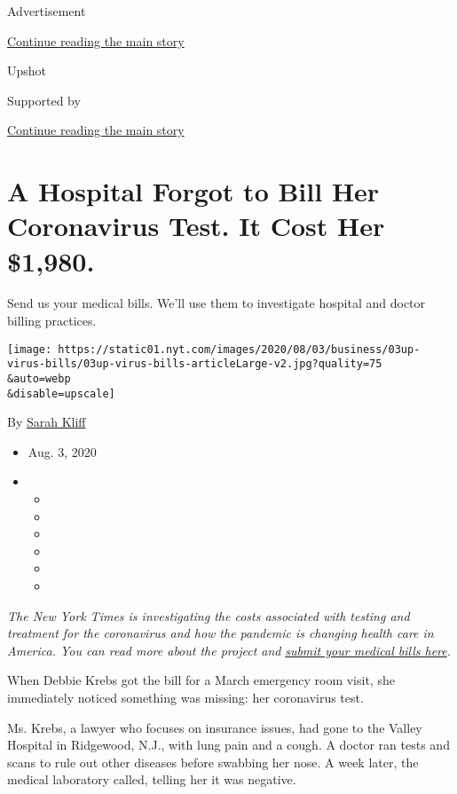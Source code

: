 Advertisement

\protect\hyperlink{after-top}{Continue reading the main story}

Upshot

Supported by

\protect\hyperlink{after-sponsor}{Continue reading the main story}

\hypertarget{a-hospital-forgot-to-bill-her-coronavirus-test-it-cost-her-1980}{%
\section{A Hospital Forgot to Bill Her Coronavirus Test. It Cost Her
\$1,980.}\label{a-hospital-forgot-to-bill-her-coronavirus-test-it-cost-her-1980}}

Send us your medical bills. We'll use them to investigate hospital and
doctor billing practices.

\texttt{[image: https://static01.nyt.com/images/2020/08/03/business/03up-virus-bills/03up-virus-bills-articleLarge-v2.jpg?quality=75\\\&auto=webp\\\&disable=upscale]}

By \href{https://www.nytimes.com/by/sarah-kliff}{Sarah Kliff}

\begin{itemize}
\item
  Aug. 3, 2020
\item
  \begin{itemize}
  \item
  \item
  \item
  \item
  \item
  \item
  \end{itemize}
\end{itemize}

\emph{The New York Times is investigating the costs associated with
testing and treatment for the coronavirus and how the pandemic is
changing health care in America. You can read more about the project
and}
\href{https://www.nytimes.com/2020/08/03/reader-center/coronavirus-medical-bills.html}{\emph{submit
your medical bills here}}\emph{.}

When Debbie Krebs got the bill for a March emergency room visit, she
immediately noticed something was missing: her coronavirus test.

Ms. Krebs, a lawyer who focuses on insurance issues, had gone to the
Valley Hospital in Ridgewood, N.J., with lung pain and a cough. A doctor
ran tests and scans to rule out other diseases before swabbing her nose.
A week later, the medical laboratory called, telling her it was
negative.

